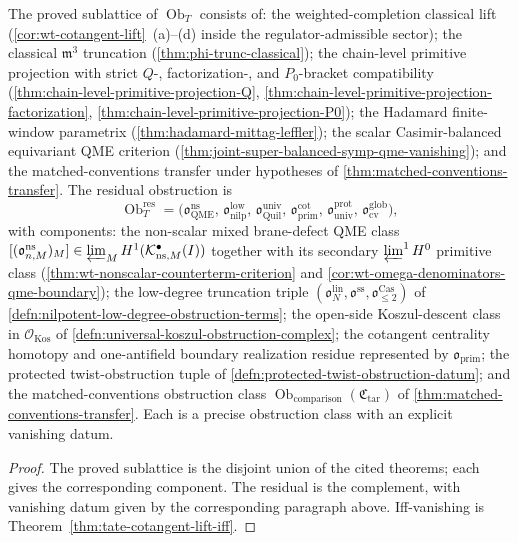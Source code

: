\documentclass[11pt]{memoir}
\begin{document}
\begin{cor}\label{cor:tate-residual-sublattice}
  The proved sublattice of \(\operatorname{Ob}_T\) consists of:
  the weighted-completion classical lift
  (\ref{cor:wt-cotangent-lift}~(a)--(d) inside the
  regulator-admissible sector); the classical \(\mathfrak m^3\)
  truncation (\ref{thm:phi-trunc-classical}); the chain-level
  primitive projection with strict \(Q\)-, factorization-, and
  \(P_0\)-bracket compatibility
  (\ref{thm:chain-level-primitive-projection-Q},
  \ref{thm:chain-level-primitive-projection-factorization},
  \ref{thm:chain-level-primitive-projection-P0}); the Hadamard
  finite-window parametrix
  (\ref{thm:hadamard-mittag-leffler}); the scalar Casimir-balanced
  equivariant QME criterion
  (\ref{thm:joint-super-balanced-symp-qme-vanishing}); and the
	  matched-conventions transfer under hypotheses of
  \ref{thm:matched-conventions-transfer}.
  The residual obstruction is
  \[
    \operatorname{Ob}_T^{\mathrm{res}}
      =
      \bigl(
        \mathfrak o_{\mathrm{QME}}^{\mathrm{ns}},\,
        \mathfrak o_{\mathrm{nilp}}^{\mathrm{low}},\,
        \mathfrak o_{\mathrm{Quil}}^{\mathrm{univ}},\,
        \mathfrak o_{\mathrm{prim}}^{\mathrm{cot}},\,
        \mathfrak o_{\mathrm{univ}}^{\mathrm{prot}},\,
        \mathfrak o_{\mathrm{cv}}^{\mathrm{glob}}
      \bigr),
  \]
  with components: the non-scalar mixed brane-defect QME class
  \([(\mathfrak o^{\mathrm{ns}}_{n,M})_M]
  \in\varprojlim_M H^1(\mathcal K^\bullet_{\mathrm{ns},M}(I))\)
  together with its secondary
  \(\varprojlim^1H^0\) primitive class
  (\ref{thm:wt-nonscalar-counterterm-criterion} and
  \ref{cor:wt-omega-denominators-qme-boundary}); the low-degree
  truncation triple
  \((\mathfrak o^{\mathrm{lin}}_N,\mathfrak o^{\mathrm{ss}},
  \mathfrak o^{\mathrm{Cas}}_{\leq2})\) of
  \ref{defn:nilpotent-low-degree-obstruction-terms}; the open-side
  Koszul-descent class in \(\mathcal O_{\mathrm{Kos}}\) of
  \ref{defn:universal-koszul-obstruction-complex}; the cotangent
  centrality homotopy and one-antifield boundary realization residue
  represented by \(\mathfrak o_{\mathrm{prim}}\); the protected
  twist-obstruction tuple of
  \ref{defn:protected-twist-obstruction-datum}; and the
  matched-conventions obstruction class
  \(\operatorname{Ob}_{\mathrm{comparison}}(\mathfrak C_{\mathrm{tar}})\) of
  \ref{thm:matched-conventions-transfer}.  Each is a precise
  obstruction class with an explicit vanishing datum.
\end{cor}

\begin{proof}
  The proved sublattice is the disjoint union of the cited theorems;
  each gives the corresponding component.  The residual is the complement,
  with vanishing datum given by the corresponding paragraph above.
  Iff-vanishing is Theorem~\ref{thm:tate-cotangent-lift-iff}.
\end{proof}
\end{document}
